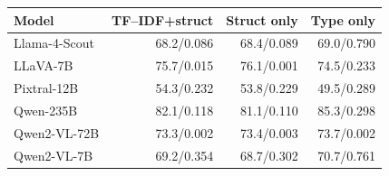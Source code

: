 \begin{tabular}{lrrr}
\toprule
Model & TF--IDF+struct & Struct only & Type only \\
\midrule
Llama-4-Scout & 68.2/0.086 & 68.4/0.089 & 69.0/0.790 \\
LLaVA-7B & 75.7/0.015 & 76.1/0.001 & 74.5/0.233 \\
Pixtral-12B & 54.3/0.232 & 53.8/0.229 & 49.5/0.289 \\
Qwen-235B & 82.1/0.118 & 81.1/0.110 & 85.3/0.298 \\
Qwen2-VL-72B & 73.3/0.002 & 73.4/0.003 & 73.7/0.002 \\
Qwen2-VL-7B & 69.2/0.354 & 68.7/0.302 & 70.7/0.761 \\
\bottomrule
\end{tabular}
